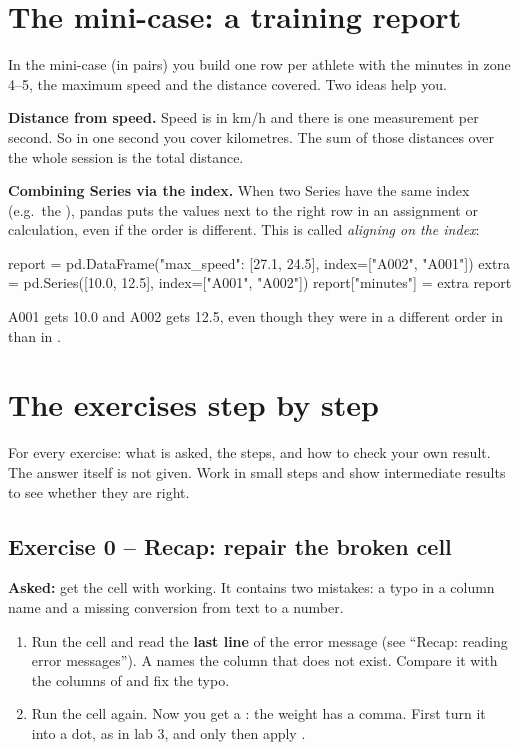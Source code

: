 \documentclass[11pt,a4paper]{article}
\begin{document}
\section{The mini-case: a training report}

In the mini-case (in pairs) you build one row per athlete with the
minutes in zone 4--5, the maximum speed and the distance covered. Two
ideas help you.

\textbf{Distance from speed.} Speed is in km/h and there is one
measurement per second. So in one second you cover
 kilometres. The sum of those distances over the
whole session is the total distance.

\textbf{Combining Series via the index.} When two Series have the same
index (e.g.\ the ), pandas puts the values next to the
right row in an assignment or calculation, even if the order is
different. This is called \emph{aligning on the index}:

\begin{python}
report = pd.DataFrame({"max_speed": [27.1, 24.5]}, index=["A002", "A001"])
extra = pd.Series([10.0, 12.5], index=["A001", "A002"])
report["minutes"] = extra
report
\end{python}

A001 gets 10.0 and A002 gets 12.5, even though they were in a different
order in  than in .

\section{The exercises step by step}

For every exercise: what is asked, the steps, and how to check your own
result. The answer itself is not given. Work in small steps and show
intermediate results to see whether they are right.

\subsection*{Exercise 0 -- Recap: repair the broken cell}

\textbf{Asked:} get the cell with  working. It contains
two mistakes: a typo in a column name and a missing conversion from text
to a number.

\begin{enumerate}
  \item Run the cell and read the \textbf{last line} of the error message
        (see ``Recap: reading error messages''). A  names
        the column that does not exist. Compare it with the columns of
         and fix the typo.
  \item Run the cell again. Now you get a : the weight
         has a comma. First turn it into a dot, as in lab 3,
        and only then apply .
\end{enumerate}
\end{document}
